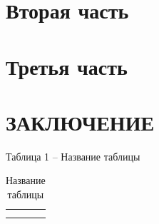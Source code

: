 \documentclass[paper=a4, fontsize=14pt, pagesize, DIV=calc, oneside]{scrreport}
\begin{document}
\chapter{Вторая часть}












\chapter{Третья часть}










\chapter*{ЗАКЛЮЧЕНИЕ}











Таблица 1 – Название таблицы


\begin{table}[htbp]
    \caption{ Название таблицы }
    \label{tab:table-bf4fce94-5760-48fd-82b3-6415e3a3add9}
    \begin{tabularx}{\textwidth}{ |X|X|X| }
        \toprule
         &  &  \\
        \midrule
         &  &  \\
         &  &  \\
        \bottomrule
    \end{tabularx}
\end{table}


\newpage
\printbibliography[heading=bibintoc, title={Список использованных источников}]
\end{document}
